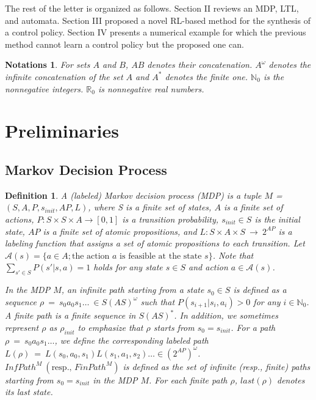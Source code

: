 \documentclass[letterpaper, 10 pt, conference]{ieeeconf}  %
\newtheorem{definition}{Definition}
\newtheorem{notations}{Notations}
\begin{document}
The rest of the letter is organized as follows.
Section II reviews an MDP, LTL, and automata.
Section III proposed a novel RL-based method for the synthesis of a control policy.
Section IV presents a numerical example for which the previous method cannot learn a control policy but the proposed one can.

\begin{notations}
  For sets $A$ and $B$, $AB$ denotes their concatenation. $A^{\omega}$ denotes the infinite concatenation of the set $A$ and $A^{\ast}$ denotes the finite one. $\mathbb{N}_0$ is the nonnegative integers. $\mathbb{R}_0$ is nonnegative real numbers.
\end{notations}

\section{Preliminaries}

\subsection{Markov Decision Process}

\begin{definition}
A (labeled) Markov decision process (MDP) is a tuple $M$ = $(S, A, P, s_{init}, AP, L)$, where S is a finite set of states, $A$ is a finite set of actions, $P:S \times S \times A \rightarrow [0,1]$ is a transition probability, $s_{init} \in S$ is the initial state, $AP$ is a finite set of atomic propositions, and $L : S \times A \times S\ \rightarrow\ 2^{AP}$ is a labeling function that assigns a set of atomic propositions to each transition. Let $\mathcal{A}(s) = \{ a \in A ; \text{the action $a$ is feasible at the state $s$} \}$. Note that $\sum_{s' \in S} P(s'|s,a) = 1$ holds for any state $s \in S$ and action $a \in \mathcal{A}(s)$.

In the MDP $M$, an infinite path starting from a state $s_0 \in S$ is defined as a sequence $\rho\ =\ s_0a_0s_1 \ldots\ \in S (A S)^{\omega}$ such that $P(s_{i+1}|s_i, a_i) > 0$ for any $ i \in \mathbb{N}_0$. A finite path is a finite sequence in $S (A S)^{\ast}$. In addition, we sometimes represent $\rho$ as $\rho_{init}$ to emphasize that $\rho$ starts from $s_0 = s_{init}$.
For a path $\rho\ =\ s_0a_0s_1 \ldots$, we define the corresponding labeled path $L(\rho)\ =\ L(s_0,a_0,s_1)L(s_1,a_1,s_2) \ldots \in (2^{AP})^{\omega}$. $InfPath^{M}\ ( \text{resp., }FinPath^{M})$ is defined as the set of infinite (resp., finite) paths starting from $s_0=s_{init}$ in the MDP $M$. For each finite path $\rho$, $last(\rho)$ denotes its last state.
\end{definition}
\end{document}
